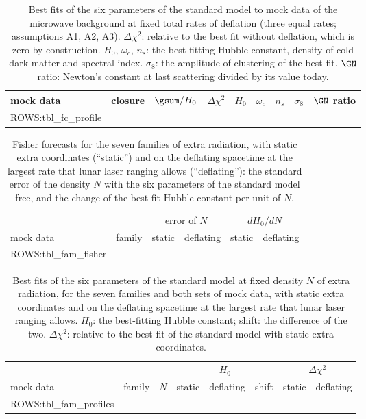 \begin{table}
\caption{\label{tab:xfcprofile}Best fits of the six parameters of the standard model to mock data of
the microwave background at fixed total rates of deflation (three equal rates; assumptions A1, A2,
A3). $\Delta\chi^{2}$: relative to the best fit without deflation, which is zero by construction.
$H_0$, $\omega_c$, $n_s$: the best-fitting Hubble constant, density of cold dark matter and spectral
index. $\sigma_8$: the amplitude of clustering of the best fit. $\GN$ ratio: Newton's constant at last
scattering divided by its value today.}
\begin{ruledtabular}
\begin{tabular}{llccccccc}
mock data & closure & $\gsum/H_0$ & $\Delta\chi^{2}$ & $H_0$ & $\omega_c$ & $n_s$ & $\sigma_8$ & $\GN$ ratio \\
\hline
{{ROWS:tbl_fc_profile}}
\end{tabular}
\end{ruledtabular}
\end{table}

\begin{table}
\caption{\label{tab:xfamfisher}Fisher forecasts for the seven families of extra radiation, with static
extra coordinates (``static'') and on the deflating spacetime at the largest rate that lunar laser
ranging allows (``deflating''): the standard error of the density $N$ with the six parameters of the
standard model free, and the change of the best-fit Hubble constant per unit of $N$.}
\begin{ruledtabular}
\begin{tabular}{llcccc}
 & & \multicolumn{2}{c}{error of $N$} & \multicolumn{2}{c}{$dH_0/dN$} \\
mock data & family & static & deflating & static & deflating \\
\hline
{{ROWS:tbl_fam_fisher}}
\end{tabular}
\end{ruledtabular}
\end{table}

\begin{table}
\caption{\label{tab:xfamprofiles}Best fits of the six parameters of the standard model at fixed
density $N$ of extra radiation, for the seven families and both sets of mock data, with static extra
coordinates and on the deflating spacetime at the largest rate that lunar laser ranging allows. $H_0$:
the best-fitting Hubble constant; shift: the difference of the two. $\Delta\chi^{2}$: relative to the
best fit of the standard model with static extra coordinates.}
\begin{ruledtabular}
\begin{tabular}{llcccccc}
 & & & \multicolumn{3}{c}{$H_0$} & \multicolumn{2}{c}{$\Delta\chi^{2}$} \\
mock data & family & $N$ & static & deflating & shift & static & deflating \\
\hline
{{ROWS:tbl_fam_profiles}}
\end{tabular}
\end{ruledtabular}
\end{table}

